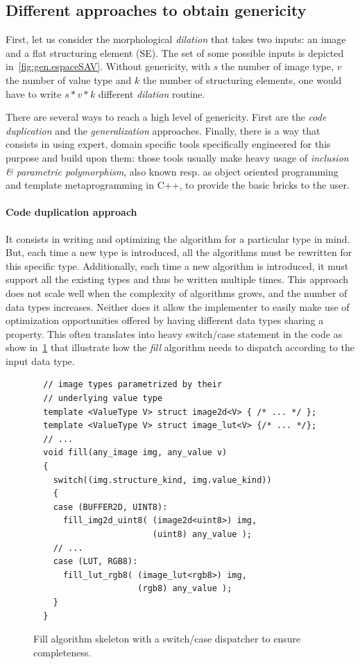 \subsection{Different approaches to obtain genericity}
\label{subsec:different.approaches}

First, let us consider the morphological \emph{dilation} that takes two inputs: an image and a flat structuring element
(SE). The set of some possible inputs is depicted in~\cref{fig:gen.espaceSAV}. Without genericity, with \(s\) the number
of image type, \(v\) the number of value type and \(k\) the number of structuring elements, one would have to write \(s
* v * k\) different \emph{dilation} routine.

There are several ways to reach a high level of genericity. First are the \emph{code duplication} and the
\emph{generalization} approaches. Finally, there is a way that consists in using expert, domain specific tools
specifically engineered for this purpose and build upon them: those tools usually make heavy usage of \emph{inclusion \&
  parametric polymorphism}, also known resp. as object oriented programming and template metaprogramming in C++, to
provide the basic bricks to the user.

\paragraph{Code duplication approach} It consists in writing and optimizing the algorithm for a particular type in mind.
But, each time a new type is introduced, all the algorithms must be rewritten for this specific type. Additionally, each
time a new algorithm is introduced, it must support all the existing types and thus be written multiple times. This
approach does not scale well when the complexity of algorithms grows, and the number of data types increases. Neither
does it allow the implementer to easily make use of optimization opportunities offered by having different data types
sharing a property. This often translates into heavy switch/case statement in the code as show in~\cref{code:gen.exhau}
that illustrate how the \emph{fill} algorithm needs to dispatch according to the input data type.

\begin{figure}[htbp]
  \centering
  \begin{verbatim}
  // image types parametrized by their
  // underlying value type
  template <ValueType V> struct image2d<V> { /* ... */ };
  template <ValueType V> struct image_lut<V> {/* ... */};
  // ...
  void fill(any_image img, any_value v)
  {
    switch((img.structure_kind, img.value_kind))
    {
    case (BUFFER2D, UINT8):
      fill_img2d_uint8( (image2d<uint8>) img,
                        (uint8) any_value );
    // ...
    case (LUT, RGB8):
      fill_lut_rgb8( (image_lut<rgb8>) img,
                     (rgb8) any_value );
    }
  }
  \end{verbatim}
  \caption{Fill algorithm skeleton with a switch/case dispatcher to ensure completeness.}
  \label{code:gen.exhau}
\end{figure}


